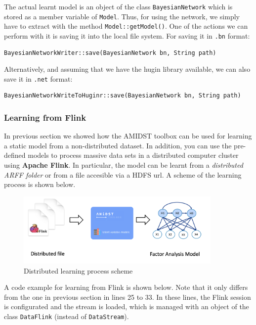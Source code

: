 \documentclass[10pt,a4paper]{article}
\begin{document}
The actual learnt model is an object of the class \texttt{BayesianNetwork} which is stored as a member variable of \texttt{Model}. Thus, for using the network, we simply have to extract with the method \texttt{Model::getModel()}. One of the actions we can perform with it is saving it into the local file system. For saving it in \texttt{.bn} format:

\begin{verbatim}
BayesianNetworkWriter::save(BayesianNetwork bn, String path)
\end{verbatim}

\noindent Alternatively, and assuming that we have the hugin library available, we can also save it in \texttt{.net} format:

\begin{verbatim}
BayesianNetworkWriteToHuginr::save(BayesianNetwork bn, String path)
\end{verbatim}



\subsubsection{Learning from Flink}\label{sec:lvmodels:static:flinklearning}

In previous section we showed how the AMIDST toolbox can be used for learning a static model from a non-distributed dataset. In addition, you can use the pre-defined models to process massive data sets in a distributed computer cluster using \textbf{Apache Flink}. In particular, the model can be learnt from a \textit{distributed ARFF folder} or from a file  accesible via a HDFS url. A scheme of the learning process is shown below.




\begin{figure}[h!]
	\centering
	\includegraphics[width=10cm]{img/distributedlearning.png}
	\caption{Distributed learning process scheme}
	\label{fig:lvmodels:static:flinklearning:scheme}	
\end{figure}

A code example for learning from Flink is shown below. Note that it only differs from the one in previous section in lines 25 to 33. In these lines, the Flink session is configurated and the stream is loaded, which is managed with an object of the class \texttt{DataFlink} (instead of \texttt{DataStream}). 
\end{document}
